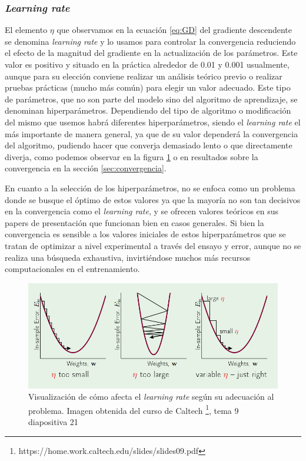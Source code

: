 \subsubsection{\textit{Learning rate}}

El elemento $\eta$ que observamos en la ecuación \ref{eq:GD} del gradiente descendente se denomina \textit{learning rate} y lo usamos para controlar la convergencia reduciendo el efecto de la magnitud del gradiente en la actualización de los parámetros. Este valor es positivo y situado en la práctica alrededor de 0.01 y 0.001 usualmente, aunque para su elección conviene realizar un análisis teórico previo o realizar pruebas prácticas (mucho más común) para elegir un valor adecuado. Este tipo de parámetros, que no son parte del modelo sino del algoritmo de aprendizaje, se denominan hiperparámetros. Dependiendo del tipo de algoritmo o modificación del mismo que usemos habrá diferentes hiperparámetros, siendo el \textit{learning rate} el más importante de manera general, ya que de su valor dependerá la convergencia del algoritmo, pudiendo hacer que converja demasiado lento o que directamente diverja, como podemos observar en la figura \ref{fig:lr} o en resultados sobre la convergencia en la sección \ref{sec:convergencia}.

En cuanto a la selección de los hiperparámetros, no se enfoca como un problema donde se busque el óptimo de estos valores ya que la mayoría no son tan decisivos en la convergencia como el \textit{learning rate}, y se ofrecen valores teóricos en sus papers de presentación que funcionan bien en casos generales. Si bien la convergencia es sensible a los valores iniciales de estos hiperparámetros que se tratan de optimizar a nivel experimental a través del ensayo y error, aunque no se realiza una búsqueda exhaustiva, invirtiéndose muchos más recursos computacionales en el entrenamiento.



\begin{figure}
    \centering
    \includegraphics[width=0.5\linewidth]{Plantilla_TFG_latex//imagenes//Mat//GD/lr.png}
    \caption{Visualización de cómo afecta el \textit{learning rate} según su adecuación al problema. Imagen obtenida del curso de Caltech \footnote{https://home.work.caltech.edu/slides/slides09.pdf}, tema 9 diapositiva 21}
    \label{fig:lr}
\end{figure}

